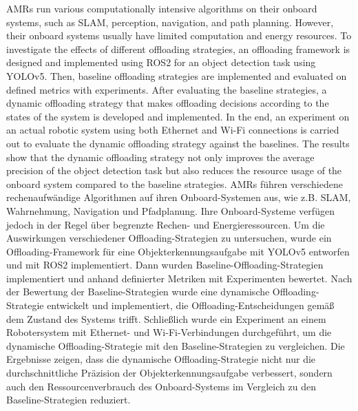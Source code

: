 {AMRs run various computationally intensive algorithms on their onboard systems, such as SLAM, perception, navigation, and path planning. However, their onboard systems usually have limited computation and energy resources. To investigate the effects of different offloading strategies, an offloading framework is designed and implemented using ROS2 for an object detection task using YOLOv5. Then, baseline offloading strategies are implemented and evaluated on defined metrics with experiments. After evaluating the baseline strategies, a dynamic offloading strategy that makes offloading decisions according to the states of the system is developed and implemented. In the end, an experiment on an actual robotic system using both Ethernet and Wi-Fi connections is carried out to evaluate the dynamic offloading strategy against the baselines. The results show that the dynamic offloading strategy not only improves the average precision of the object detection task but also reduces the resource usage of the onboard system compared to the baseline strategies. 
}{%
%
AMRs führen verschiedene rechenaufwändige Algorithmen auf ihren Onboard-Systemen aus, wie z.B. SLAM, Wahrnehmung, Navigation und Pfadplanung. Ihre Onboard-Systeme verfügen jedoch in der Regel über begrenzte Rechen- und Energieressourcen. Um die Auswirkungen verschiedener Offloading-Strategien zu untersuchen, wurde ein Offloading-Framework für eine Objekterkennungsaufgabe mit YOLOv5 entworfen und mit ROS2 implementiert. Dann wurden Baseline-Offloading-Strategien implementiert und anhand definierter Metriken mit Experimenten bewertet. Nach der Bewertung der Baseline-Strategien wurde eine dynamische Offloading-Strategie entwickelt und implementiert, die Offloading-Entscheidungen gemäß dem Zustand des Systems trifft. Schließlich wurde ein Experiment an einem Robotersystem mit Ethernet- und Wi-Fi-Verbindungen durchgeführt, um die dynamische Offloading-Strategie mit den Baseline-Strategien zu vergleichen. Die Ergebnisse zeigen, dass die dynamische Offloading-Strategie nicht nur die durchschnittliche Präzision der Objekterkennungsaufgabe verbessert, sondern auch den Ressourcenverbrauch des Onboard-Systems im Vergleich zu den Baseline-Strategien reduziert.
}%
%
%
